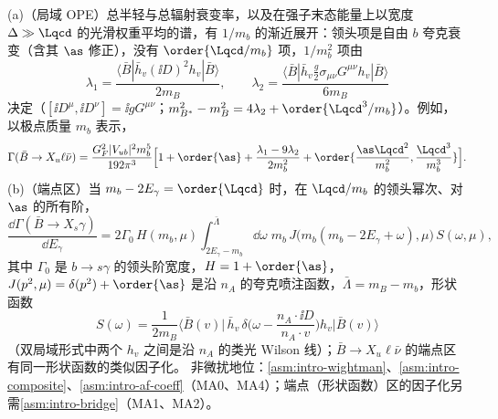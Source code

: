 \begin{theorem}\label{thm:heavy-inclusive-b}
(a)（局域 OPE）总半轻与总辐射衰变率，以及在强子末态能量上以宽度 $\Delta\gg\Lqcd$ 的光滑权重平均的谱，有 $1/m_b$ 的渐近展开：领头项是自由 $b$ 夸克衰变（含其 $\as$ 修正），没有 $\order{\Lqcd/m_b}$ 项，$1/m_b^2$ 项由
\begin{equation}\label{eq:heavy-lambda12}
\lambda_1=\frac{\langle\bar B|\bar h_v(\ii D)^2h_v|\bar B\rangle}{2m_B},\qquad
\lambda_2=\frac{\langle\bar B|\bar h_v\frac g2\sigma_{\mu\nu}G^{\mu\nu}h_v|\bar B\rangle}{6m_B}
\end{equation}
决定（$[\ii D^\mu,\ii D^\nu]=\ii gG^{\mu\nu}$；$m_{B^*}^2-m_B^2=4\lambda_2+\order{\Lqcd^3/m_b}$）。例如，以极点质量 $m_b$ 表示，
\begin{equation}\label{eq:heavy-Gamma-bu}
\Gamma(\bar B\to X_u\ell\bar\nu)=\frac{G_F^2|V_{ub}|^2m_b^5}{192\pi^3}\Big[1+\order{\as}+\frac{\lambda_1-9\lambda_2}{2m_b^2}+\order{\frac{\as\Lqcd^2}{m_b^2},\frac{\Lqcd^3}{m_b^3}}\Big].
\end{equation}
(b)（端点区）当 $m_b-2E_\gamma=\order{\Lqcd}$ 时，在 $\Lqcd/m_b$ 的领头幂次、对 $\as$ 的所有阶，
\begin{equation}\label{eq:heavy-HJS}
\frac{\dd\Gamma(\bar B\to X_s\gamma)}{\dd E_\gamma}=2\Gamma_0\,H(m_b,\mu)\int_{2E_\gamma-m_b}^{\bar\Lambda}\dd\omega\;m_b\,J\big(m_b(m_b-2E_\gamma+\omega),\mu\big)\,S(\omega,\mu),
\end{equation}
其中 $\Gamma_0$ 是 $b\to s\gamma$ 的领头阶宽度，$H=1+\order{\as}$，$J(p^2,\mu)=\delta(p^2)+\order{\as}$ 是沿 $n_A$ 的夸克喷注函数，$\bar\Lambda=m_B-m_b$，形状函数
\begin{equation}\label{eq:heavy-shape}
S(\omega)=\frac{1}{2m_B}\Big\langle\bar B(v)\Big|\,\bar h_v\,\delta\Big(\omega-\frac{n_A\cdot\ii D}{n_A\cdot v}\Big)h_v\Big|\bar B(v)\Big\rangle
\end{equation}
（双局域形式中两个 $h_v$ 之间是沿 $n_A$ 的类光 Wilson 线）；$\bar B\to X_u\ell\bar\nu$ 的端点区有同一形状函数的类似因子化。
非微扰地位：\cref{asm:intro-wightman}、\cref{asm:intro-composite}、\cref{asm:intro-af-coeff}（MA0、MA4）；端点（形状函数）区的因子化另需\cref{asm:intro-bridge}（MA1、MA2）。
\end{theorem}

